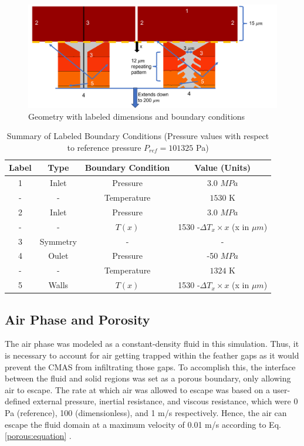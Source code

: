 \documentclass{UCF_ETD}
\begin{document}
\begin{figure}
\centering
\includegraphics[width=0.9\linewidth]{Figures/dimensions.png}
\caption{Geometry with labeled dimensions and boundary conditions}
\label{dimensions}
\end{figure}



\begin{table}[htp!]
\caption{\label{tab:boundaryConditions} Summary of Labeled Boundary Conditions (Pressure values with respect to reference pressure $P_{ref} = 101325$ Pa)}
\centering
\begin{tabular}{cccc}
Label &Type& Boundary Condition& Value (Units)\\\hline
1& Inlet&Pressure & 3.0 $MPa$\\
-& -&Temperature& $1530$ K\\
2& Inlet&Pressure& 3.0  $MPa$\\
-& -&$T(x)$& 1530 -$\Delta T_{x}\times x$ (x in $\mu m$)\\
3& Symmetry&- & -\\
4& Oulet&Pressure& -50 $MPa$\\
-& -&Temperature & $1324$ K \\
5& Walls&$T(x)$& 1530 -$\Delta T_{x}\times x$ (x in $\mu m$)\\
\end{tabular}
\end{table}

\subsection{Air Phase and Porosity}
The air phase was modeled as a constant-density fluid in this simulation. Thus, it is necessary to account for air getting trapped within the feather gaps as it would prevent the CMAS from infiltrating those gaps. To accomplish this, the interface between the fluid and solid regions was set as a porous boundary, only allowing air to escape. The rate at which air was allowed to escape was based on a user-defined external pressure, inertial resistance, and viscous resistance, which were 0 Pa (reference), 100 (dimensionless), and 1 m/s respectively. Hence, the air can escape the fluid domain at a maximum velocity of 0.01 m/s according to Eq. \ref{porous:equation} \cite{starccm}.
\end{document}
